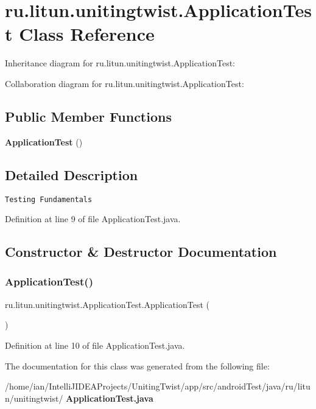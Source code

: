 \section{ru.\+litun.\+unitingtwist.\+Application\+Test Class Reference}
\label{classru_1_1litun_1_1unitingtwist_1_1_application_test}


Inheritance diagram for ru.\+litun.\+unitingtwist.\+Application\+Test\+:


Collaboration diagram for ru.\+litun.\+unitingtwist.\+Application\+Test\+:
\subsection*{Public Member Functions}
\begin{DoxyCompactItemize}
\item 
\textbf{ Application\+Test} ()
\end{DoxyCompactItemize}


\subsection{Detailed Description}
{\tt Testing Fundamentals} 

Definition at line 9 of file Application\+Test.\+java.



\subsection{Constructor \& Destructor Documentation}
\mbox{\label{classru_1_1litun_1_1unitingtwist_1_1_application_test_a07cede0761d8eeeb099e70d155653082}} 
\subsubsection{Application\+Test()}
{\footnotesize\ttfamily ru.\+litun.\+unitingtwist.\+Application\+Test.\+Application\+Test (\begin{DoxyParamCaption}{ }\end{DoxyParamCaption})}



Definition at line 10 of file Application\+Test.\+java.



The documentation for this class was generated from the following file\+:\begin{DoxyCompactItemize}
\item 
/home/ian/\+Intelli\+J\+I\+D\+E\+A\+Projects/\+Uniting\+Twist/app/src/android\+Test/java/ru/litun/unitingtwist/\textbf{ Application\+Test.\+java}\end{DoxyCompactItemize}
